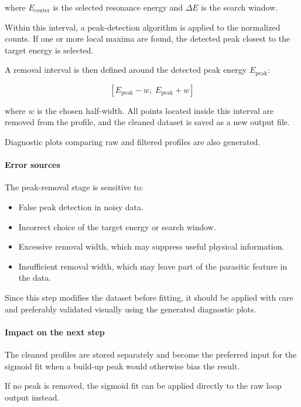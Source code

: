 where \(E_{\mathrm{center}}\) is the selected resonance energy and
\(\Delta E\) is the search window.

Within this interval, a peak-detection algorithm is applied to the
normalized counts. If one or more local maxima are found, the detected
peak closest to the target energy is selected.

A removal interval is then defined around the detected peak energy
\(E_{\mathrm{peak}}\):

\[
[E_{\mathrm{peak}} - w,\; E_{\mathrm{peak}} + w]
\]

where \(w\) is the chosen half-width. All points located inside this
interval are removed from the profile, and the cleaned dataset is saved
as a new output file.

Diagnostic plots comparing raw and filtered profiles are also generated.

\hypertarget{error-sources-3}{%
\paragraph{Error sources}\label{error-sources-3}}

The peak-removal stage is sensitive to:

\begin{itemize}
\tightlist
\item
  False peak detection in noisy data.
\item
  Incorrect choice of the target energy or search window.
\item
  Excessive removal width, which may suppress useful physical
  information.
\item
  Insufficient removal width, which may leave part of the parasitic
  feature in the data.
\end{itemize}

Since this step modifies the dataset before fitting, it should be
applied with care and preferably validated visually using the generated
diagnostic plots.

\hypertarget{impact-on-the-next-step-3}{%
\paragraph{Impact on the next step}\label{impact-on-the-next-step-3}}

The cleaned profiles are stored separately and become the preferred
input for the sigmoid fit when a build-up peak would otherwise bias the
result.

If no peak is removed, the sigmoid fit can be applied directly to the
raw loop output instead.

